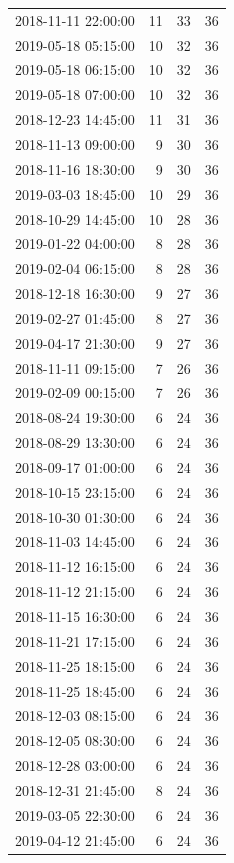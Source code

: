 \begin{tabular}{lrrr}
2018-11-11 22:00:00 & 11 & 33 & 36 \\
2019-05-18 05:15:00 & 10 & 32 & 36 \\
2019-05-18 06:15:00 & 10 & 32 & 36 \\
2019-05-18 07:00:00 & 10 & 32 & 36 \\
2018-12-23 14:45:00 & 11 & 31 & 36 \\
2018-11-13 09:00:00 & 9 & 30 & 36 \\
2018-11-16 18:30:00 & 9 & 30 & 36 \\
2019-03-03 18:45:00 & 10 & 29 & 36 \\
2018-10-29 14:45:00 & 10 & 28 & 36 \\
2019-01-22 04:00:00 & 8 & 28 & 36 \\
2019-02-04 06:15:00 & 8 & 28 & 36 \\
2018-12-18 16:30:00 & 9 & 27 & 36 \\
2019-02-27 01:45:00 & 8 & 27 & 36 \\
2019-04-17 21:30:00 & 9 & 27 & 36 \\
2018-11-11 09:15:00 & 7 & 26 & 36 \\
2019-02-09 00:15:00 & 7 & 26 & 36 \\
2018-08-24 19:30:00 & 6 & 24 & 36 \\
2018-08-29 13:30:00 & 6 & 24 & 36 \\
2018-09-17 01:00:00 & 6 & 24 & 36 \\
2018-10-15 23:15:00 & 6 & 24 & 36 \\
2018-10-30 01:30:00 & 6 & 24 & 36 \\
2018-11-03 14:45:00 & 6 & 24 & 36 \\
2018-11-12 16:15:00 & 6 & 24 & 36 \\
2018-11-12 21:15:00 & 6 & 24 & 36 \\
2018-11-15 16:30:00 & 6 & 24 & 36 \\
2018-11-21 17:15:00 & 6 & 24 & 36 \\
2018-11-25 18:15:00 & 6 & 24 & 36 \\
2018-11-25 18:45:00 & 6 & 24 & 36 \\
2018-12-03 08:15:00 & 6 & 24 & 36 \\
2018-12-05 08:30:00 & 6 & 24 & 36 \\
2018-12-28 03:00:00 & 6 & 24 & 36 \\
2018-12-31 21:45:00 & 8 & 24 & 36 \\
2019-03-05 22:30:00 & 6 & 24 & 36 \\
2019-04-12 21:45:00 & 6 & 24 & 36 \\

\end{tabular}
